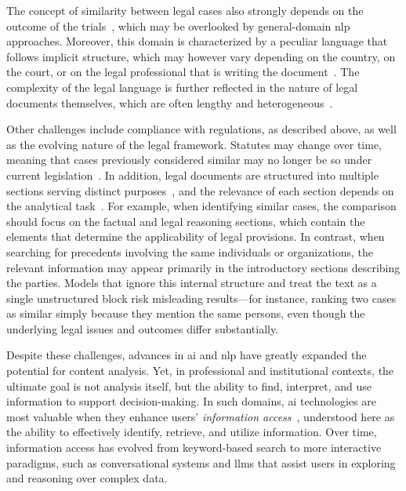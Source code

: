 The concept of similarity between legal cases also strongly depends on the outcome of the trials~\cite{SANSONE2022101967}, which may be overlooked by general-domain \ac{nlp} approaches.
Moreover, this domain is characterized by a peculiar language that follows implicit structure, which may however vary depending on the country, on the court, or on the legal professional that is writing the document~\cite{SANSONE2022101967,breit_legal_permits_2020}. The complexity of the legal language is further reflected in the nature of legal documents themselves, which are often lengthy and heterogeneous~\cite{SANSONE2022101967}.

Other challenges include compliance with regulations, as described above, as well as the evolving nature of the legal framework. Statutes may change over time, meaning that cases previously considered similar may no longer be so under current legislation~\cite{feng-etal-2024-legal}. In addition, legal documents are structured into multiple sections serving distinct purposes~\cite[Art.~132]{CPC}, and the relevance of each section depends on the analytical task~\cite{feng-etal-2024-legal}. For example, when identifying similar cases, the comparison should focus on the factual and legal reasoning sections, which contain the elements that determine the applicability of legal provisions. In contrast, when searching for precedents involving the same individuals or organizations, the relevant information may appear primarily in the introductory sections describing the parties. Models that ignore this internal structure and treat the text as a single unstructured block risk misleading results---for instance, ranking two cases as similar simply because they mention the same persons, even though the underlying legal issues and outcomes differ substantially.

\medskip
\noindent
Despite these challenges, advances in \acf{ai} and \acf{nlp} have greatly expanded the potential for content analysis. Yet, in professional and institutional contexts, the ultimate goal is not analysis itself, but the ability to find, interpret, and use information to support decision-making. In such domains, \ac{ai} technologies are most valuable when they enhance users' \emph{information access}~\cite{human-ai-system-legal-precedent-search-china}, understood here as the ability to effectively identify, retrieve, and utilize information. Over time, information access has evolved from keyword-based search to more interactive paradigms, such as conversational systems and \acp{llm} that assist users in exploring and reasoning over complex data.

